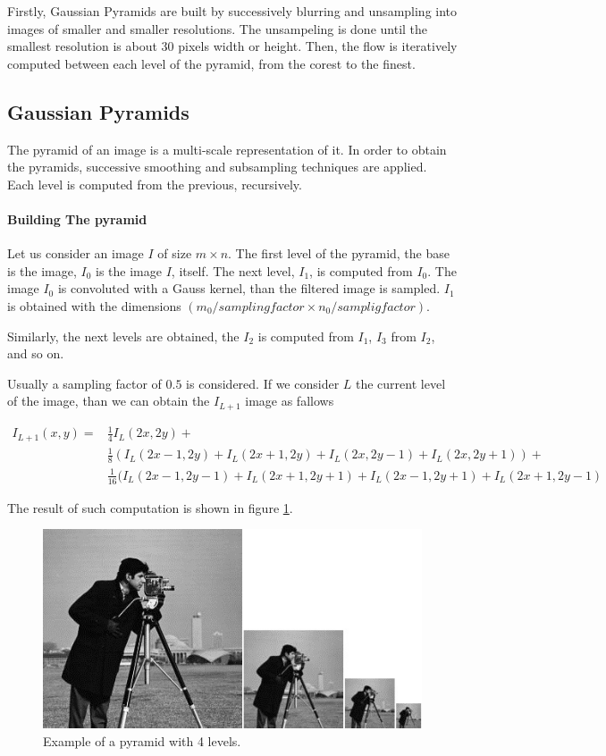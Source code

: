 \documentclass[12pt,a4paper,twoside]{report}
\begin{document}
 
Firstly, Gaussian Pyramids are built by successively blurring and unsampling into images of smaller and smaller resolutions. The unsampeling is done until the smallest resolution is about 30 pixels width or height.  Then, the flow is iteratively computed between each level of the pyramid, from the corest to the finest.
\subsection{Gaussian Pyramids}
The pyramid of an image is a multi-scale representation of it. In order to obtain the pyramids, successive smoothing and subsampling techniques are applied.  Each level is computed from the previous, recursively.


\paragraph{Building The pyramid} 
 Let us consider an image $I$ of size $m \times n$. The first level of the pyramid, the base is the image, $I_0$ is the image $I$, itself. The next level, $I_1$, is computed from $I_0$. The image $I_0$ is convoluted with a Gauss kernel, than the filtered image is sampled. $I_1$ is obtained with the dimensions $(m_0/sampling factor \times n_0/samplig factor)$. 

Similarly, the next levels are obtained, the $I_2$ is computed from $I_1$, $I_3$ from $I_2$, and so on.

Usually a sampling factor of $0.5$ is considered. If we consider $L$ the current level of the image, than we can obtain the $I_{L+1}$ image as fallows



\begin{equation} \label{eq1}
\begin{split}
I_{L+1}(x,y) = &\frac{1}{4}I_L(2x,2y)+\\
&\frac{1}{8}(I_L(2x-1,2y)+I_L(2x+1,2y)+I_L(2x,2y-1)+I_L(2x,2y+1))+\\
&\frac{1}{16}(I_L(2x-1,2y-1)+I_L(2x+1,2y+1)+I_L(2x-1,2y+1)+I_L(2x+1,2y-1) 
\end{split}
\end{equation}

The result of such computation is shown in figure \ref{cameraPyr}.

\begin{figure}
	\label{cameraPyr}
	\centering
	\includegraphics{img/cameraman}
	\caption{Example of a pyramid with 4 levels.}
\end{figure}
\end{document}

